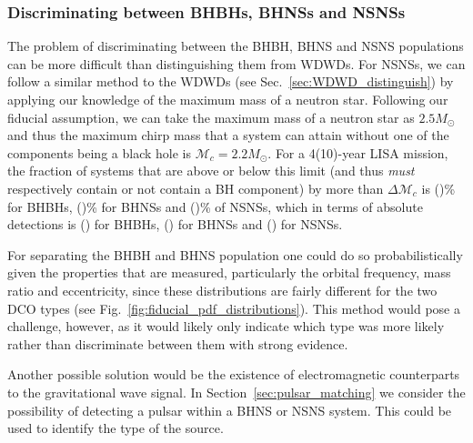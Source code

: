 \subsubsection{Discriminating between BHBHs, BHNSs and NSNSs}

The problem of discriminating between the BHBH, BHNS and NSNS populations can be more difficult than distinguishing them from WDWDs. For NSNSs, we can follow a similar method to the WDWDs (see Sec.~\ref{sec:WDWD_distinguish}) by applying our knowledge of the maximum mass of a neutron star. Following our fiducial assumption, we can take the maximum mass of a neutron star as $2.5 \unit{M_{\odot}}$ and thus the maximum chirp mass that a system can attain without one of the components being a black hole is $\mathcal{M}_{c} = 2.2 \unit{M_\odot}$. For a 4(10)-year LISA mission, the fraction of systems that are above or below this limit (and thus \textit{must} respectively contain or not contain a BH component) by more than $\Delta \mathcal{M}_c$ is \BHBHEitherBHOrNSFourPerc{}(\BHBHEitherBHOrNSTenPerc{})\% for BHBHs, \BHNSEitherBHOrNSFourPerc{}(\BHNSEitherBHOrNSTenPerc{})\% for BHNSs and \NSNSEitherBHOrNSFourPerc{}(\NSNSEitherBHOrNSTenPerc{})\% of NSNSs, which in terms of absolute detections is \BHBHEitherBHOrNSFour{}(\BHBHEitherBHOrNSTen{}) for BHBHs, \BHNSEitherBHOrNSFour{}(\BHNSEitherBHOrNSTen{}) for BHNSs and \NSNSEitherBHOrNSFour{}(\NSNSEitherBHOrNSTen{}) for NSNSs.

For separating the BHBH and BHNS population one could do so probabilistically given the properties that are measured, particularly the orbital frequency, mass ratio and eccentricity, since these distributions are fairly different for the two DCO types (see Fig.~\ref{fig:fiducial_pdf_distributions}). This method would pose a challenge, however, as it would likely only indicate which type was more likely rather than discriminate between them with strong evidence.

Another possible solution would be the existence of electromagnetic counterparts to the gravitational wave signal. In Section~\ref{sec:pulsar_matching} we consider the possibility of detecting a pulsar within a BHNS or NSNS system. This could be used to identify the type of the source.

